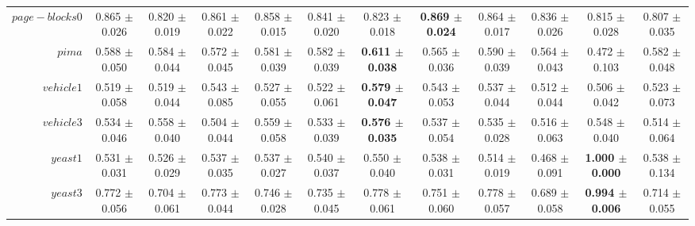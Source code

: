 \begin{table}[!ht]
{\begin{tabular}{r c c c c c c c c c c c}
$page-blocks0$ & 0.865 $\pm$ 0.026 & 0.820 $\pm$ 0.019 & 0.861 $\pm$ 0.022 & 0.858 $\pm$ 0.015 & 0.841 $\pm$ 0.020 & 0.823 $\pm$ 0.018 & \textbf{0.869 $\pm$ 0.024} & 0.864 $\pm$ 0.017 & 0.836 $\pm$ 0.026 & 0.815 $\pm$ 0.028 & 0.807 $\pm$ 0.035 \\
$pima$ & 0.588 $\pm$ 0.050 & 0.584 $\pm$ 0.044 & 0.572 $\pm$ 0.045 & 0.581 $\pm$ 0.039 & 0.582 $\pm$ 0.039 & \textbf{0.611 $\pm$ 0.038} & 0.565 $\pm$ 0.036 & 0.590 $\pm$ 0.039 & 0.564 $\pm$ 0.043 & 0.472 $\pm$ 0.103 & 0.582 $\pm$ 0.048 \\
$vehicle1$ & 0.519 $\pm$ 0.058 & 0.519 $\pm$ 0.044 & 0.543 $\pm$ 0.085 & 0.527 $\pm$ 0.055 & 0.522 $\pm$ 0.061 & \textbf{0.579 $\pm$ 0.047} & 0.543 $\pm$ 0.053 & 0.537 $\pm$ 0.044 & 0.512 $\pm$ 0.044 & 0.506 $\pm$ 0.042 & 0.523 $\pm$ 0.073 \\
$vehicle3$ & 0.534 $\pm$ 0.046 & 0.558 $\pm$ 0.040 & 0.504 $\pm$ 0.044 & 0.559 $\pm$ 0.058 & 0.533 $\pm$ 0.039 & \textbf{0.576 $\pm$ 0.035} & 0.537 $\pm$ 0.054 & 0.535 $\pm$ 0.028 & 0.516 $\pm$ 0.063 & 0.548 $\pm$ 0.040 & 0.514 $\pm$ 0.064 \\
$yeast1$ & 0.531 $\pm$ 0.031 & 0.526 $\pm$ 0.029 & 0.537 $\pm$ 0.035 & 0.537 $\pm$ 0.027 & 0.540 $\pm$ 0.037 & 0.550 $\pm$ 0.040 & 0.538 $\pm$ 0.031 & 0.514 $\pm$ 0.019 & 0.468 $\pm$ 0.091 & \textbf{1.000 $\pm$ 0.000} & 0.538 $\pm$ 0.134 \\
$yeast3$ & 0.772 $\pm$ 0.056 & 0.704 $\pm$ 0.061 & 0.773 $\pm$ 0.044 & 0.746 $\pm$ 0.028 & 0.735 $\pm$ 0.045 & 0.778 $\pm$ 0.061 & 0.751 $\pm$ 0.060 & 0.778 $\pm$ 0.057 & 0.689 $\pm$ 0.058 & \textbf{0.994 $\pm$ 0.006} & 0.714 $\pm$ 0.055 \\
\end{tabular}}
\end{table}
